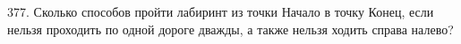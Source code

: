377. Сколько способов пройти лабиринт из точки Начало в точку Конец, если нельзя проходить по одной дороге
дважды, а также нельзя ходить справа налево?\\
\begin{figure}[ht!]
\end{figure}\\
